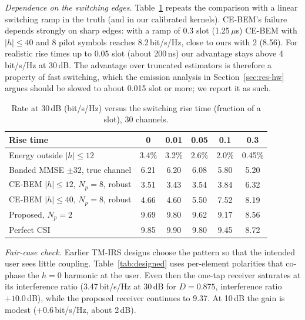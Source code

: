 \emph{Dependence on the switching edges.} Table~\ref{tab:rise} repeats the comparison with a linear switching ramp
in the truth (and in our calibrated kernels). CE-BEM's failure depends strongly on sharp edges: with a ramp of 0.3 slot
(1.25\,$\mu$s) CE-BEM with $|h|\le40$ and 8 pilot symbols reaches 8.2\,bit/s/Hz, close to ours with 2 (8.56). For
realistic rise times up to 0.05 slot (about 200\,ns) our advantage stays above 4\,bit/s/Hz at 30\,dB. The advantage over
truncated estimators is therefore a property of fast switching, which the emission analysis in
Section~\ref{sec:res-hw} argues should be slowed to about 0.015 slot or more; we report it as such.

\begin{table}[!htbp]\centering
\caption{Rate at 30\,dB (bit/s/Hz) versus the switching rise time (fraction of a slot), 30 channels.}\label{tab:rise}
\begin{tabular}{lccccc}\toprule
Rise time & 0 & 0.01 & 0.05 & 0.1 & 0.3 \\\midrule
Energy outside $|h|\le12$ & 3.4\% & 3.2\% & 2.6\% & 2.0\% & 0.45\% \\
Banded MMSE $\pm32$, true channel & 6.21 & 6.20 & 6.08 & 5.80 & 5.20 \\
CE-BEM $|h|\le12$, $N_p=8$, robust & 3.51 & 3.43 & 3.54 & 3.84 & 6.32 \\
CE-BEM $|h|\le40$, $N_p=8$, robust & 4.66 & 4.60 & 5.50 & 7.52 & 8.19 \\
Proposed, $N_p=2$ & 9.69 & 9.80 & 9.62 & 9.17 & 8.56 \\
Perfect CSI & 9.85 & 9.90 & 9.80 & 9.45 & 8.72 \\\bottomrule
\end{tabular}
\end{table}

\emph{Fair-case check.} Earlier TM-IRS designs choose the pattern so that the intended user sees
little coupling. Table~\ref{tab:designed} uses per-element polarities that co-phase the $h=0$
harmonic at the user. Even then the one-tap receiver saturates at its interference ratio
(3.47\,bit/s/Hz at 30\,dB for $D=0.875$, interference ratio $+10.0$\,dB), while the proposed
receiver continues to 9.37. At 10\,dB the gain is modest (+0.6\,bit/s/Hz, about 2\,dB).


